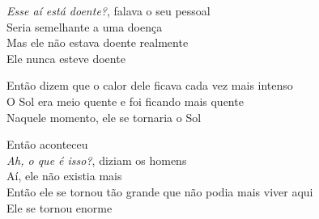 \smallskip
\begin{center}\end{center}
\smallskip

\noindent \textit{Esse aí está doente?}, falava o seu pessoal\\
Seria semelhante a uma doença\\
Mas ele não estava doente realmente\\
Ele nunca esteve doente

\smallskip
\begin{center}\end{center}
\smallskip

\noindent Então dizem que o calor dele ficava cada vez mais intenso\\
O Sol era meio quente e foi ficando mais quente\\
Naquele momento, ele se tornaria o Sol

\smallskip
\begin{center}\end{center}
\smallskip

\noindent Então aconteceu\\
\textit{Ah, o que é isso?}, diziam os homens\\
Aí, ele não existia mais\\
Então ele se tornou tão grande que não podia mais viver aqui\\
Ele se tornou enorme\\


